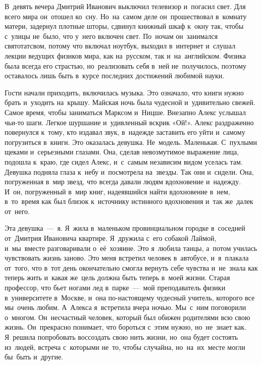 В~девять вечера Дмитрий Иванович выключил телевизор и~погасил свет.
Для всего мира он~отошел ко~сну.
Но~на~самом деле он~прошествовал в~комнату матери, задернул плотные шторы, сдвинул книжный шкаф к~окну так, чтобы с~улицы не~было, что у~него включен свет.
По~ночам он~занимался святотатсвом, потому что включал ноутбук, выходил в~интернет и~слушал лекции ведущих физиков мира, как на~русском, так и~на~английском.
Физика была всегда его страстью, но~реализовать себя в~ней не~получилось, поэтому оставалось лишь быть в~курсе последних достижений любимой науки.

\vspace{1cm}

Гости начали приходить, включилась музыка.
Это означало, что книги нужно брать и~уходить на~крышу.
Майская ночь была чудесной и~удивительно свежей.
Самое время, чтобы заниматься Марксом и~Ницше.
Внезапно Алекс услышал чьи-то шаги.
Легкое шуршание и~удивленный вскрик «Ой!».
Алекс раздраженно повернулся к~тому, кто издавал звук, в~надежде заставить его уйти и~самому погрузиться в~книги.
Это оказалась девушка.
Не~модель.
Маленькая.
С~пухлыми щеками и~серьезными глазами.
Она, сделав невозмутимое выражение лица, подошла к~краю, где сидел Алекс, и~с~самым независим видом уселась там.
Девушка подняла глаза к~небу и~посмотрела на~звезды.
Так они и~сидели.
Она, погруженная в~мир звезд, что всегда давали людям вдохновение и~надежду.
И~он, погруженный в~мир книг, надеявшийся найти вдохновение в~нем, в~то~время как был близок к~источнику истинного вдохновения и~так же~далек от~него.

\vspace{1cm}

Эта девушка~---~я.
Я~жила в~маленьком провинциальном городке в~соседней от~Дмитрия Ивановича квартире.
Я~дружила с~его собакой Лаймой, и~мы~вместе разговаривали о~её~хозяине.
Это я~любила танцы, а~потом училась чувствовать жизнь заново.
Это меня встретил человек в~автобусе, и~я~плакала от~того, что в~тот день окончательно смогла вернуть себе чувства и~не~знала как теперь жить и~какая же~цель должна быть теперь в~моей жизни.
Старая профессор, что бьет ногами лед в~парке~---~мой преподаватель физики в~университете в~Москве, и~она по-настоящему чудесный учитель, которого все мы~очень любим.
А~Алекса я~встретила вчера ночью.
Мы~с~ним поговорили о~многом.
Он~несчастный человек, который был обижен родителями всю свою жизнь.
Он~прекрасно понимает, что бороться с~этим нужно, но~не~знает как.
Я~решила попробовать воссоздать свою нить жизни, но~она будет состоять из~людей, встреча с~которыми не~то, чтобы случайна, но~на~их~месте могли бы~быть и~другие.

